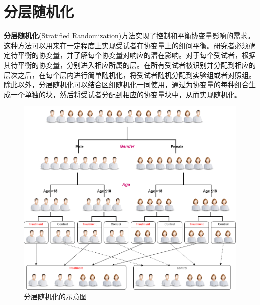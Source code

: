 
\section{分层随机化}

\textbf{分层随机化}(Stratified Randomization)方法实现了控制和平衡协变量影响的需求。这种方法可以用来在一定程度上实现受试者在协变量上的组间平衡。研究者必须确定待平衡的协变量，并了解每个协变量对响应的潜在影响。对于每个受试者，根据其待平衡的协变量，分别进入相应所属的层。在所有受试者被识别并分配到相应的层次之后，在每个层内进行简单随机化，将受试者随机分配到实验组或者对照组。除此以外，分层随机化可以结合区组随机化一同使用，通过为协变量的每种组合生成一个单独的块，然后将受试者分配到相应的协变量块中，从而实现随机化。\cite{suresh2011overview}

\begin{figure}[!htbp]
    \centering
    \includegraphics[width=0.8\linewidth]{figures/Stratified Randomization.drawio.png}
    \caption{分层随机化的示意图}
    \label{fig:Stratified Randomization}
\end{figure}

